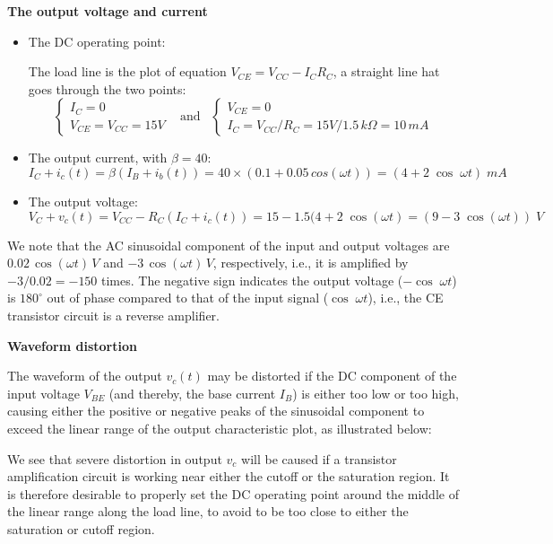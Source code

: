 {\bf The output voltage and current}

\begin{itemize}
\item The DC operating point:

  The load line is the plot of equation $V_{CE}=V_{CC}-I_C R_C$, a 
  straight line hat goes through the two points:
  \[ 
  \left\{\begin{array}{l}
  I_C=0\\ V_{CE}=V_{CC}=15V\end{array}\right.
  \;\;\;\mbox{and}\;\;\;
  \left\{\begin{array}{l}
  V_{CE}=0\\I_C=V_{CC}/R_C=15V/1.5\,k\Omega=10\, mA \end{array}\right.
  \]
\item The output current, with $\beta=40$:
  \[
  I_C+i_c(t)=\beta (I_B+i_b(t))=40\times (0.1+0.05\, cos(\omega t))
  =(4 + 2\;\cos\;\omega t) \; mA 
  \]
\item The output voltage:
  \[
  V_C+v_c(t)=V_{CC}-R_C(I_C+i_c(t))=15-1.5 (4 + 2\;\cos(\omega t )
  =(9-3\;\cos(\omega t)) \; V  
  \]
\end{itemize}


We note that the AC sinusoidal component of the input and output 
voltages are $0.02\,\cos(\omega t)\,V$ and $-3\,\cos(\omega t)\,V$, 
respectively, i.e., it is amplified by $-3/0.02=-150$ times. The
negative sign indicates the output voltage ($-\cos\;\omega t$) 
is $180^\circ$ out of phase compared to that of the input signal 
($\cos\;\omega t$), i.e., the CE transistor circuit is a reverse 
amplifier.

{\bf Waveform distortion}

The waveform of the output $v_c(t)$ may be distorted if the DC component 
of the input voltage $V_{BE}$ (and thereby, the base current $I_B$) is 
either too low or too high, causing either the positive or negative 
peaks of the sinusoidal component to exceed the linear range of the 
output characteristic plot, as illustrated below:



We see that severe distortion in output $v_c$ will be caused if a transistor 
amplification circuit is working near either the cutoff or the saturation 
region. It is therefore desirable to properly set the DC operating point 
around the middle of the linear range along the load line, to avoid to be
too close to either the saturation or cutoff region.

